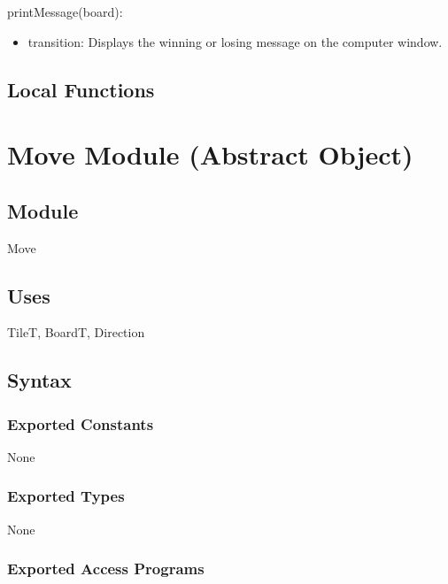\documentclass[12pt]{article}
\begin{document}
\noindent printMessage(board):
\begin{itemize}
\item transition: Displays the winning or losing message on the computer window.
\end{itemize}

\subsection*{Local Functions}

\newpage



\section* {Move Module (Abstract Object)}

\subsection*{Module}

Move

\subsection* {Uses}

TileT, BoardT, Direction

\subsection* {Syntax}

\subsubsection* {Exported Constants}

None

\subsubsection* {Exported Types}

None

\subsubsection* {Exported Access Programs}
\end{document}
